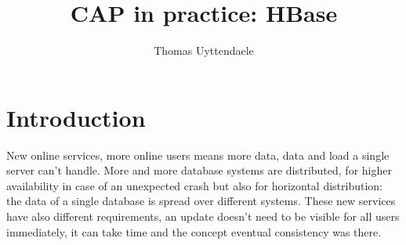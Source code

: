\documentclass[final,5p,times]{elsarticle}
\begin{document}
\begin{frontmatter}



\title{CAP in practice: HBase}


\author{Thomas Uyttendaele}

\address{}

\begin{abstract}

\end{abstract}

\begin{keyword}

\end{keyword}

\end{frontmatter}


\section{Introduction}

New online services, more online users means more data, data and load a single server can't handle. More and more database systems are distributed, for higher availability in case of an unexpected crash but also for horizontal distribution: the data of a single database is spread over different systems. These new services have also different requirements, an update doesn't need to be visible for all users immediately, it can take time and the concept eventual consistency was there. 
\end{document}
